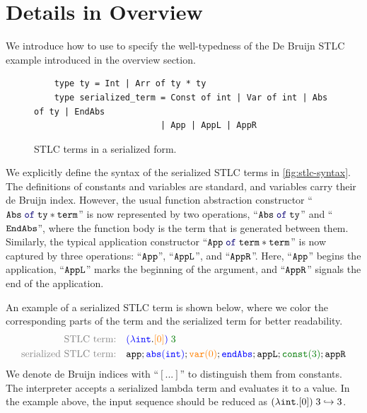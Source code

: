 \section{Details in Overview}\label{sec:tech:details-overview}

We introduce how to use \tyName to specify the well-typedness of the De Bruijn STLC example introduced in the overview section.

\begin{figure}[th!]
  \begin{verbatim}
    type ty = Int | Arr of ty * ty
    type serialized_term = Const of int | Var of int | Abs of ty | EndAbs
                         | App | AppL | AppR
  \end{verbatim}
  \vspace*{-.1in}
  \caption{STLC terms in a serialized form.}
  \label{fig:stlc-syntax}
  \vspace*{-.1in}
\end{figure}

We explicitly define the syntax of the serialized STLC terms in \autoref{fig:stlc-syntax}. The definitions of constants and variables are standard, and variables
carry their de Bruijn index. However, the usual function abstraction
constructor ``$\Code{Abs\;\mykw{of}\;ty * term}$'' is now represented
by two operations, ``$\Code{Abs\;\mykw{of}\;ty}$'' and
``${\tt EndAbs}$'', where the function body is the term that is
generated between them. Similarly, the typical application constructor
``$\Code{App\;\mykw{of}\;term * term}$'' is now captured by three
operations: ``${\tt App}$'', ``${\tt AppL}$'', and ``${\tt AppR}$''.
Here, ``${\tt App}$'' begins the application, ``${\tt AppL}$'' marks the beginning of
the argument, and ``${\tt AppR}$'' signals the end of the application.

An example of a serialized STLC term is shown below, where we color
the corresponding parts of the term and the serialized term for better
readability.
\begin{align*}
  \text{\textcolor{gray}{STLC term:}} \quad & \textcolor{blue}{(\lambda \Int}. \textcolor{orange}{[0]} \textcolor{blue}{)}\; \textcolor{DeepGreen}{3} \\
  \text{\textcolor{gray}{serialized STLC term:}} \quad & \eff{app}; \textcolor{blue}{\zevent{abs}{\Int}}; \textcolor{orange}{\zevent{var}{0}}; \textcolor{blue}{\eff{endAbs}}; \eff{appL}; \textcolor{DeepGreen}{\zevent{const}{3}}; \eff{appR}
\end{align*}
\noindent
We denote de Bruijn indices with ``$[...]$'' to distinguish them from
constants. The interpreter accepts a
serialized lambda term and evaluates it to a value. In the example
above, the input sequence should be reduced as $(\lambda {\tt int}. [0])\;3
\hookrightarrow 3$.

